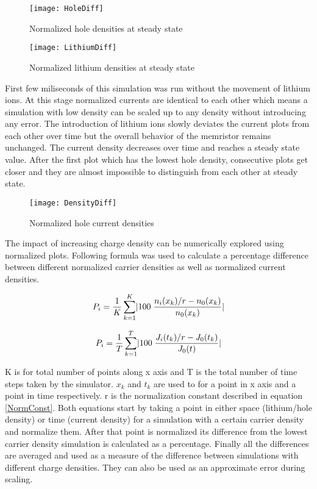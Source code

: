\begin{doublespace}
\begin{figure}[!htp]
\centering
\texttt{[image: HoleDiff]}
\caption{Normalized hole densities at steady state} 
\label{HoleDiff}
\end{figure}

\begin{figure}[!htp]
\centering
\texttt{[image: LithiumDiff]}
\caption{Normalized lithium densities at steady state} 
\label{LithiumDiff}
\end{figure}

First few miliseconds of this simulation was run without the movement of lithium ions. At this stage normalized currents are identical to each other which means a simulation with low density can be scaled up to any density without introducing any error. The introduction of lithium ions slowly deviates the current plots from each other over time but the overall behavior of the memristor remains unchanged. The current density decreases over time and reaches a steady state value. After the first plot which has the lowest hole density, consecutive plots get closer and they are almost impossible to distinguish from each other at steady state.

\begin{figure}[!htp]
\centering
\texttt{[image: DensityDiff]}
\caption{Normalized hole current densities} 
\label{DensityDiff}
\end{figure}

The impact of increasing charge density can be numerically explored using normalized plots. Following formula was used to calculate a percentage difference between different normalized carrier densities as well as normalized current densities. 


\begin{equation}
\centering
P_i = \frac{1}{ K}\sum_{k=1}^{K}\lvert 100 \;\frac{n_{i}(x_k)/r-n_{0}(x_k)}{n_{0}(x_k)}\rvert
\end{equation}

\begin{equation}
\centering
P_i = \frac{1}{ T}\sum_{k=1}^{T}\lvert 100 \;\frac{J_{i}(t_k)/r-J_{0}(t_k)}{J_{0}(t)}\rvert
\end{equation}


K is for total number of points along x axis and T is the total number of time steps taken by the simulator. $x_{k}$ and $t_{k}$ are used to for a point in x axis and a point in time respectively. r is the normalization constant described in equation \ref{NormConst}. Both equations start by taking a point in either space (lithium/hole density) or time (current density) for a simulation with a certain carrier density and normalize them. After that point is normalized its difference from the lowest carrier density simulation is calculated as a percentage. Finally all the differences are averaged and used as a measure of the difference between simulations with different charge densities. They can also be used as an approximate error during scaling. 


\end{doublespace}
